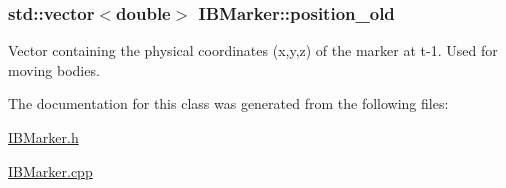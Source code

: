 \subsubsection[{\texorpdfstring{position\+\_\+old}{position_old}}]{\setlength{\rightskip}{0pt plus 5cm}std\+::vector$<$double$>$ I\+B\+Marker\+::position\+\_\+old\hspace{0.3cm}{\ttfamily [protected]}}\hypertarget{class_i_b_marker_a6a55fe2293f288ae339036ea4a3bc7df}{}\label{class_i_b_marker_a6a55fe2293f288ae339036ea4a3bc7df}


Vector containing the physical coordinates (x,y,z) of the marker at t-\/1. Used for moving bodies. 



The documentation for this class was generated from the following files\+:\begin{DoxyCompactItemize}
\item 
\hyperlink{_i_b_marker_8h}{I\+B\+Marker.\+h}\item 
\hyperlink{_i_b_marker_8cpp}{I\+B\+Marker.\+cpp}\end{DoxyCompactItemize}

